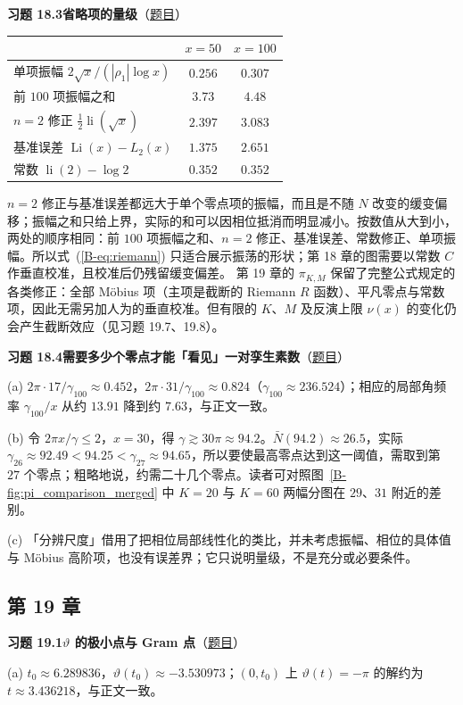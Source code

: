 \documentclass[11pt,a4paper]{article}
\DeclareMathOperator{\Li}{Li}
\DeclareMathOperator{\li}{li}
\newcommand{\bref}[1]{\ref*{B-#1}}
\newcommand{\Sol}[2]{%
  \par\addvspace{1.2em}\noindent
  \hypertarget{s:#1}{}\textbf{习题 #1\quad #2}\hfill{\small（\hyperlink{q:#1}{题目}）}\par
  \nopagebreak\smallskip}
\begin{document}
\Sol{18.3}{省略项的量级}
\begin{center}
\small
\begin{tabular}{@{}lcc@{}}
\toprule
 & $x=50$ & $x=100$ \\
\midrule
单项振幅 $2\sqrt x/(|\rho_1|\log x)$ & $0.256$ & $0.307$ \\
前 $100$ 项振幅之和 & $3.73$ & $4.48$ \\
$n=2$ 修正 $\frac12\li(\sqrt x)$ & $2.397$ & $3.083$ \\
基准误差 $\Li(x)-L_2(x)$ & $1.375$ & $2.651$ \\
常数 $\li(2)-\log2$ & $0.352$ & $0.352$ \\
\bottomrule
\end{tabular}
\end{center}
$n=2$ 修正与基准误差都远大于单个零点项的振幅，而且是不随 $N$ 改变的缓变偏移；振幅之和只给上界，实际的和可以因相位抵消而明显减小。按数值从大到小，两处的顺序相同：前 $100$ 项振幅之和、$n=2$ 修正、基准误差、常数修正、单项振幅。所以式~(\bref{eq:riemann}) 只适合展示振荡的形状；第 18 章的图需要以常数 $C$ 作垂直校准，且校准后仍残留缓变偏差。
第 19 章的 $\pi_{K,M}$ 保留了完整公式规定的各类修正：全部 Möbius 项（主项是截断的 Riemann $R$ 函数）、平凡零点与常数项，因此无需另加人为的垂直校准。但有限的 $K$、$M$ 及反演上限 $\nu(x)$ 的变化仍会产生截断效应（见习题 19.7、19.8）。

\Sol{18.4}{需要多少个零点才能「看见」一对孪生素数}
(a) $2\pi\cdot17/\gamma_{100}\approx0.452$，$2\pi\cdot31/\gamma_{100}\approx0.824$（$\gamma_{100}\approx236.524$）；相应的局部角频率 $\gamma_{100}/x$ 从约 $13.91$ 降到约 $7.63$，与正文一致。

(b) 令 $2\pi x/\gamma\le2$，$x=30$，得 $\gamma\gtrsim30\pi\approx94.2$。$\bar N(94.2)\approx26.5$，实际 $\gamma_{26}\approx92.49<94.25<\gamma_{27}\approx94.65$，所以要使最高零点达到这一阈值，需取到第 $27$ 个零点；粗略地说，约需二十几个零点。读者可对照图~\bref{fig:pi_comparison_merged} 中 $K=20$ 与 $K=60$ 两幅分图在 $29$、$31$ 附近的差别。

(c) 「分辨尺度」借用了把相位局部线性化的类比，并未考虑振幅、相位的具体值与 Möbius 高阶项，也没有误差界；它只说明量级，不是充分或必要条件。

\subsection*{第 19 章}

\Sol{19.1}{$\vartheta$ 的极小点与 Gram 点}
(a) $t_0\approx6.289836$，$\vartheta(t_0)\approx-3.530973$；$(0,t_0)$ 上 $\vartheta(t)=-\pi$ 的解约为 $t\approx3.436218$，与正文一致。
\end{document}
